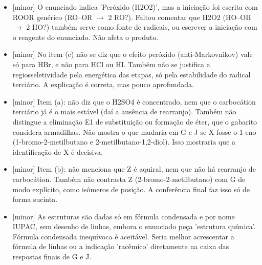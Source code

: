 \documentclass{article}%
\begin{document}
\begin{itemize}%
\item%
{[}minor{]} O enunciado indica 'Peróxido (H2O2)', mas a iniciação foi escrita com ROOR genérico (RO--OR $\to$ 2 RO?). Faltou comentar que H2O2 (HO--OH $\to$ 2 HO?) também serve como fonte de radicais, ou escrever a iniciação com o reagente do enunciado. Não afeta o produto.%
\item%
{[}minor{]} No item (c) não se diz que o efeito peróxido (anti{-}Markovnikov) vale só para HBr, e não para HCl ou HI. Também não se justifica a regiosseletividade pela energética das etapas, só pela estabilidade do radical terciário. A explicação é correta, mas pouco aprofundada.%
\item%
{[}minor{]} Item (a): não diz que o H2SO4 é concentrado, nem que o carbocátion terciário já é o mais estável (daí a ausência de rearranjo). Também não distingue a eliminação E1 de substituição ou formação de éter, que o gabarito considera armadilhas. Não mostra o que mudaria em G e J se X fosse o 1{-}eno (1{-}bromo{-}2{-}metilbutano e 2{-}metilbutano{-}1,2{-}diol). Isso mostraria que a identificação de X é decisiva.%
\item%
{[}minor{]} Item (b): não menciona que Z é aquiral, nem que não há rearranjo de carbocátion. Também não contrasta Z (2{-}bromo{-}2{-}metilbutano) com G de modo explícito, como isômeros de posição. A conferência final faz isso só de forma sucinta.%
\item%
{[}minor{]} As estruturas são dadas só em fórmula condensada e por nome IUPAC, sem desenho de linhas, embora o enunciado peça 'estrutura química'. Fórmula condensada inequívoca é aceitável. Seria melhor acrescentar a fórmula de linhas ou a indicação 'racêmico' diretamente na caixa das respostas finais de G e J.%
\end{itemize}%
\end{document}
